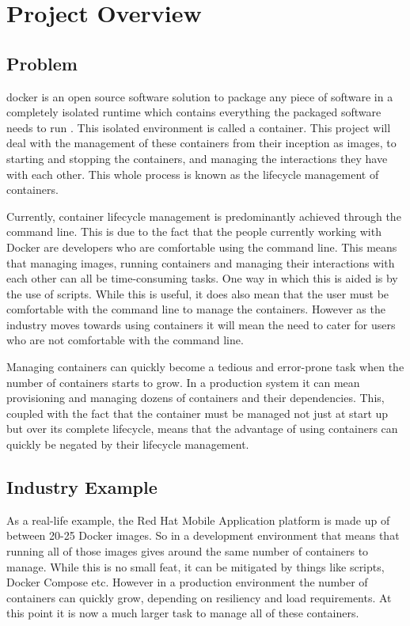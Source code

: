 \section{Project Overview}
\subsection{Problem}
\label{sub:problem}

\gls{docker} is an \gls{open source} software solution to package any piece of software in a completely isolated runtime which contains everything the packaged software needs to run \citep{WhatDocker}. This isolated environment is called a \gls{container}. This project will deal with the management of these containers from their inception as images, to starting and stopping the containers, and managing the interactions they have with each other. This whole process is known as the \gls{lifecycle management} of containers.

Currently, container \gls{lifecycle management} is predominantly achieved through the \gls{command line}. This is due to the fact that the people currently working with Docker are developers who are comfortable using the command line. This means that managing images, running containers and managing their interactions with each other can all be time-consuming tasks. One way in which this is aided is by the use of scripts. While this is useful, it does also mean that the user must be comfortable with the command line to manage the containers. However as the industry moves towards using containers \citep{Datadog2016} it will mean the need to cater for users who are not comfortable with the command line.

Managing containers can quickly become a tedious and error-prone task when the number of containers starts to grow. In a production system it can mean provisioning and managing dozens of containers and their dependencies. This, coupled with the fact that the container must be managed not just at start up but over its complete lifecycle, means that the advantage of using containers can quickly be negated by their lifecycle management.

\subsection{Industry Example}
\label{sub:industry}
As a real-life example, the Red Hat Mobile Application platform \citep{RedHat2016} is made up of between 20-25 Docker images. So in a development environment that means that running all of those images gives around the same number of containers to manage. While this is no small feat, it can be mitigated by things like scripts, Docker Compose etc. However in a production environment the number of containers can quickly grow, depending on resiliency and load requirements. At this point it is now a much larger task to manage all of these containers. 

